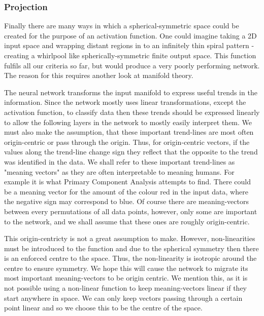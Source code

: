 \documentclass[onecolumn]{article}
\begin{document}
    \subsubsection{Projection}
        
    Finally there are many ways in which a spherical-symmetric space could be created for the purpose of an activation function. One could imagine taking a 2D input space and wrapping distant regions in to an infinitely thin spiral pattern - creating a whirlpool like spherically-symmetric finite output space. This function fulfils all our criteria so far, but would produce a very poorly performing network. The reason for this requires another look at manifold theory.

    The neural network transforms the input manifold to express useful trends in the information. Since the network mostly uses linear transformations, except the activation function, to classify data then these trends should be expressed linearly to allow the following layers in the network to mostly easily interpret them. We must also make the assumption, that these important trend-lines are most often origin-centric or pass through the origin. Thus, for origin-centric vectors, if the values along the trend-line change sign they reflect that the opposite to the trend was identified in the data. We shall refer to these important trend-lines as "meaning vectors" as they are often interpretable to meaning humans. For example it is what Primary Component Analysis attempts to find. There could be a meaning vector for the amount of the colour red in the input data, where the negative sign may correspond to blue. Of course there are meaning-vectors between every permutations of all data points, however, only some are important to the network, and we shall assume that these ones are roughly origin-centric.

    This origin-centricty is not a great assumption to make. However, non-linearities must be introduced to the function and due to the spherical symmetry then there is an enforced centre to the space. Thus, the non-linearity is isotropic around the centre to ensure symmetry. We hope this will cause the network to migrate its most important meaning-vectors to be origin centric. We mention this, as it is not possible using a non-linear function to keep meaning-vectors linear if they start anywhere in space. We can only keep vectors passing through a certain point linear and so we choose this to be the centre of the space.
\end{document}
